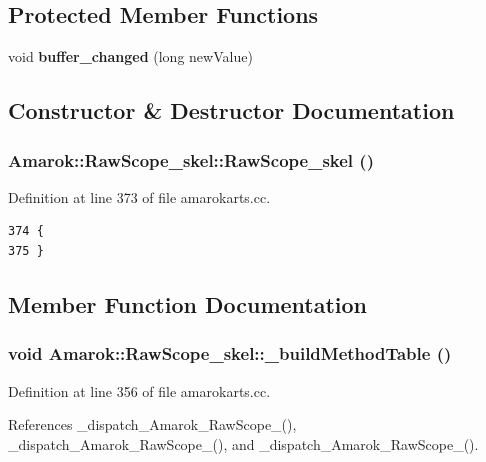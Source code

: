 \subsection*{Protected Member Functions}
\begin{CompactItemize}
\item 
void {\bf buffer\_\-changed} (long new\-Value)
\end{CompactItemize}


\subsection{Constructor \& Destructor Documentation}
\subsubsection{\setlength{\rightskip}{0pt plus 5cm}Amarok::Raw\-Scope\_\-skel::Raw\-Scope\_\-skel ()}\label{classAmarok_1_1RawScope__skel_Amarok_1_1RawScope__skela0}




Definition at line 373 of file amarokarts.cc.



\footnotesize\begin{verbatim}374 {
375 }
\end{verbatim}\normalsize 


\subsection{Member Function Documentation}
\subsubsection{\setlength{\rightskip}{0pt plus 5cm}void Amarok::Raw\-Scope\_\-skel::\_\-build\-Method\-Table ()}\label{classAmarok_1_1RawScope__skel_Amarok_1_1RawScope__skela3}




Definition at line 356 of file amarokarts.cc.

References \_\-dispatch\_\-Amarok\_\-Raw\-Scope\_(), \_\-dispatch\_\-Amarok\_\-Raw\-Scope\_(), and \_\-dispatch\_\-Amarok\_\-Raw\-Scope\_().




